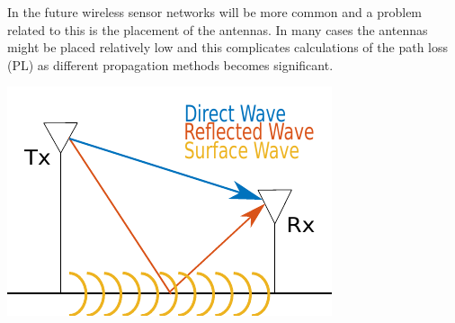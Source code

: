 \large


In the future wireless sensor networks will be more common and a problem related to this is the placement of the antennas. In many cases the antennas might be placed relatively low and this complicates calculations of the path loss (PL) as different propagation methods becomes significant. 

\begin{center}
\includegraphics[scale=0.75]{pix/poster_cropped.pdf}
\label{fig:name}
\end{center}
